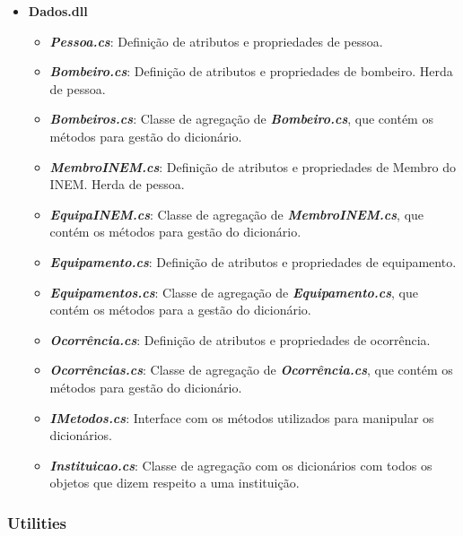 \documentclass[11pt]{scrartcl} %
\begin{document}
\begin{itemize}
	\item \textbf{Dados.dll}
	\begin{itemize}
		\item \emph{\textbf{Pessoa.cs}}: Definição de atributos e propriedades de pessoa.
		\item \emph{\textbf{Bombeiro.cs}}: Definição de atributos e propriedades de bombeiro. Herda de pessoa.
		\item \emph{\textbf{Bombeiros.cs}}: Classe de agregação de \emph{\textbf{Bombeiro.cs}}, que contém os métodos para gestão do dicionário.
		\item \emph{\textbf{MembroINEM.cs}}: Definição de atributos e propriedades de Membro do INEM. Herda de pessoa.
		\item \emph{\textbf{EquipaINEM.cs}}: Classe de agregação de \emph{\textbf{MembroINEM.cs}}, que contém os métodos para gestão do dicionário.
		\item \emph{\textbf{Equipamento.cs}}: Definição de atributos e propriedades de equipamento.
		\item \emph{\textbf{Equipamentos.cs}}: Classe de agregação de \emph{\textbf{Equipamento.cs}}, que contém os métodos para a gestão do dicionário.
		\item \emph{\textbf{Ocorrência.cs}}: Definição de atributos e propriedades de ocorrência.
		\item \emph{\textbf{Ocorrências.cs}}: Classe de agregação de \emph{\textbf{Ocorrência.cs}}, que contém os métodos para gestão do dicionário.
		\item \emph{\textbf{IMetodos.cs}}: Interface com os métodos utilizados para manipular os dicionários.
		\item \emph{\textbf{Instituicao.cs}}: Classe de agregação com os dicionários com todos os objetos que dizem respeito a uma instituição.
	\end{itemize}
\end{itemize}

\subsubsection{Utilities}
\end{document}
